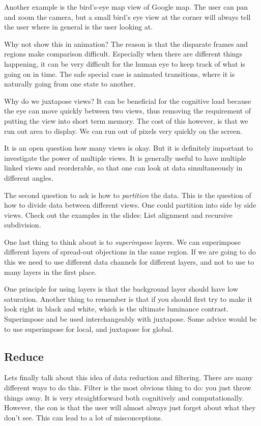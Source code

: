\documentclass[letterpaper, 11pt]{article}
\numberwithin{equation}{section}
\numberwithin{figure}{section}
\begin{document}
Another example is the bird's-eye map view of Google map. The user can pan and
zoom the camera, but a small bird's eye view at the corner will always tell the
user where in general is the user looking at.

Why not show this in animation? The reason is that the disparate frames and
regions make comparison difficult. Especially when there are different things
happening, it can be very difficult for the human eye to keep track of what is
going on in time. The safe special case is animated transitions, where it is
naturally going from one state to another.

Why do we juxtapose views? It can be beneficial for the cognitive load because
the eye can move quickly between two views, thus removing the requirement of
putting the view into short term memory. The cost of this however, is that we
run out area to display. We can run out of pixels very quickly on the screen.

It is an open question how many views is okay. But it is definitely important to
investigate the power of multiple views. It is generally useful to have multiple
linked views and reorderable, so that one can look at data simultaneously in
different angles.

The second question to ask is how to \emph{partition} the data. This is the
question of how to divide data between different views. One could partition into
side by side views. Check out the examples in the slides: List alignment and
recursive subdivision.

One last thing to think about is to \emph{superimpose} layers. We can
superimpose different layers of spread-out objections in the same region. If we
are going to do this we need to use different data channels for different
layers, and not to use to many layers in the first place.

One principle for using layers is that the background layer should have low
saturation. Another thing to remember is that if you should first try to make it
look right in black and white, which is the ultimate luminance contrast.
Superimpose and be used interchangeably with juxtapose. Some advice would be to
use superimpose for local, and juxtapose for global.

\subsection{Reduce}

Lets finally talk about this idea of data reduction and filtering. There are
many different ways to do this. Filter is the most obvious thing to do: you just
throw things away. It is very straightforward both cognitively and
computationally. However, the con is that the user will almost always just
forget about what they don't see. This can lead to a lot of misconceptions.
\end{document}
